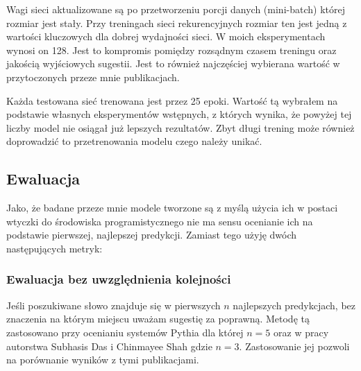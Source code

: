 Wagi sieci aktualizowane są po przetworzeniu porcji danych (mini-batch) której rozmiar jest stały. Przy treningach sieci rekurencyjnych rozmiar
ten jest jedną z wartości kluczowych dla dobrej wydajności sieci. W moich eksperymentach wynosi on 128. Jest to kompromis pomiędzy rozsądnym 
czasem treningu oraz jakością wyjściowych sugestii. Jest to również najczęściej wybierana wartość w przytoczonych przeze mnie publikacjach.

Każda testowana sieć trenowana jest przez 25 epoki. Wartość tą wybrałem na podstawie własnych eksperymentów wstępnych, z których wynika, że 
powyżej tej liczby model nie osiągał już lepszych rezultatów. Zbyt długi trening może również doprowadzić to przetrenowania modelu czego 
należy unikać. 

\subsection{Ewaluacja}
Jako, że badane przeze mnie modele tworzone są z myślą użycia ich w postaci wtyczki do środowiska programistycznego nie ma sensu ocenianie ich na podstawie pierwszej, najlepszej predykcji. 
Zamiast tego użyję dwóch następujących metryk: 
\subsubsection{Ewaluacja bez uwzględnienia kolejności}
Jeśli poszukiwane słowo znajduje się w pierwszych \begin{math}n\end{math} najlepszych predykcjach, bez znaczenia na którym miejscu uważam sugestię za poprawną. Metodę tą zastosowano przy ocenianiu systemów
Pythia \cite{pythia} dla której \begin{math}n = 5\end{math} oraz w pracy autorstwa Subhasis Das i Chinmayee Shah \cite{contextual_code_completion} gdzie \begin{math}n = 3\end{math}. Zastosowanie jej pozwoli na porównanie 
wyników z tymi publikacjami. 
